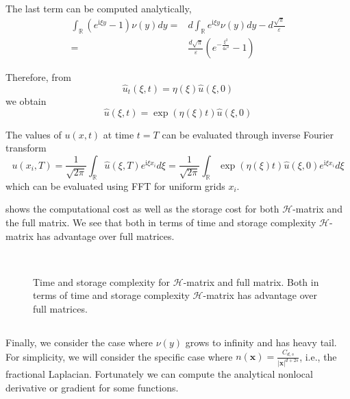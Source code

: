 \documentclass[10pt,a4paper]{article}
\newcommand{\ii}[0]{\mathrm{i}}
\newcommand{\RR}[0]{\mathbb{R}}
\newcommand{\bx}[0]{\mathbf{x}}
\theoremstyle{definition}
\begin{document}
The last term can be computed analytically,
\begin{align}
	\int_{\RR} {({e^{\ii\xi y}} - 1)} \nu (y)dy =& d\int_{\RR} {{e^{\ii\xi y}}\nu (y)} dy - d\frac{{\sqrt \pi  }}{\varepsilon }\\
	 =&\frac{{ d\sqrt \pi  }}{\varepsilon }\left( {{e^{ - \frac{{{\xi ^2}}}{{4{\varepsilon ^2}}}}} - 1} \right)
\end{align}

Therefore, from 
\begin{equation}
	\hat u_t(\xi, t) = \eta(\xi) \hat u(\xi, 0)
\end{equation}
we obtain
\begin{equation}
	\hat u(\xi, t) = \exp(\eta(\xi)t)\hat u(\xi, 0)
\end{equation}

The values of $u(x,t)$ at time $t=T$ can be evaluated through inverse Fourier transform
\begin{equation}
	u(x_i, T) = \frac{1}{\sqrt{2\pi}}\int_\RR \hat u(\xi, T) e^{\ii \xi x_i} d\xi  = \frac{1}{\sqrt{2\pi}}\int_\RR  \exp(\eta(\xi)t)\hat u(\xi, 0) e^{\ii \xi x_i} d\xi 
\end{equation}
which can be evaluated using FFT for uniform grids $x_i$. 

 shows the computational cost as well as the storage cost for both $\mathcal{H}$-matrix and the full matrix. We see that both in terms of time and storage complexity $\mathcal{H}$-matrix has advantage over full matrices.

\begin{figure}[htpb]
\centering
\scalebox{0.3}{}~
\scalebox{0.3}{}

\caption{Time and storage complexity for $\mathcal{H}$-matrix and full matrix. Both in terms of time and storage complexity $\mathcal{H}$-matrix has advantage over full matrices.}
\label{fig:s}
\end{figure}

\subsection{}

Finally, we consider the case where $\nu(y)$ grows to infinity and has heavy tail. For simplicity, we will consider the specific case where $n(\bx) = \frac{C_{d, s}}{|\bx|^{d+2s}}$, i.e., the fractional Laplacian. Fortunately we can compute  the analytical nonlocal derivative or gradient for some functions. 
\end{document}
